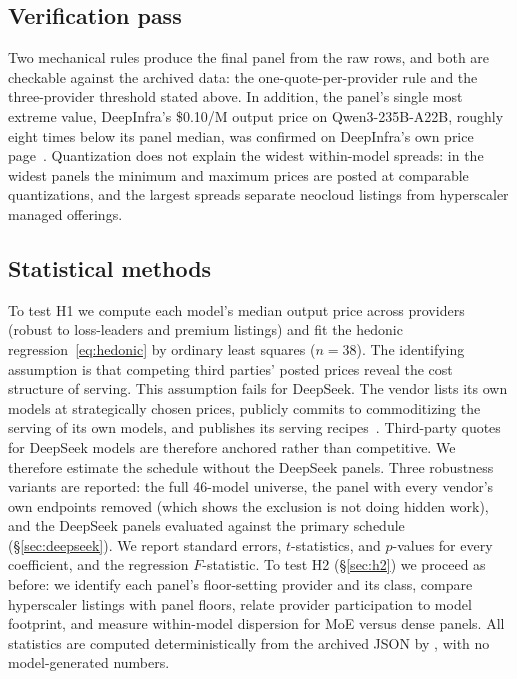 \documentclass[11pt]{article}
\begin{document}
\subsection{Verification pass}
\label{sec:verify}

Two mechanical rules produce the final panel from the raw rows, and both are
checkable against the archived data: the one-quote-per-provider rule and the
three-provider threshold stated above. In addition, the panel's single most
extreme value, DeepInfra's \$0.10/M output price on Qwen3-235B-A22B, roughly
eight times below its panel median, was confirmed on DeepInfra's own price
page~\cite{r18}. Quantization does not explain the widest within-model
spreads: in the widest panels the minimum and maximum prices are posted at
comparable quantizations, and the largest spreads separate neocloud
listings from hyperscaler managed offerings.

\subsection{Statistical methods}
\label{sec:methods}

To test H1 we compute each model's median output price across providers
(robust to loss-leaders and premium listings) and fit the hedonic
regression~\eqref{eq:hedonic} by ordinary least squares ($n = 38$). The
identifying assumption is that competing third parties' posted prices reveal
the cost structure of serving. This assumption fails for DeepSeek. The
vendor lists its own models at strategically chosen prices, publicly commits
to commoditizing the serving of its own models, and publishes its serving
recipes~\cite{r10,r8}. Third-party quotes for DeepSeek models are therefore
anchored rather than competitive. We therefore estimate the schedule without
the DeepSeek panels. Three robustness variants are reported: the full
46-model universe, the panel with every vendor's own endpoints removed
(which shows the exclusion is not doing hidden work), and the DeepSeek
panels evaluated against the primary schedule (\S\ref{sec:deepseek}). We report standard
errors, $t$-statistics, and $p$-values for every coefficient, and the
regression $F$-statistic. To test H2 (\S\ref{sec:h2}) we proceed as before:
we identify each panel's floor-setting provider and its class, compare
hyperscaler listings with panel floors, relate provider participation to
model footprint, and measure within-model dispersion for MoE versus dense
panels. All statistics are computed deterministically from the archived
JSON by , with no model-generated numbers.
\end{document}
